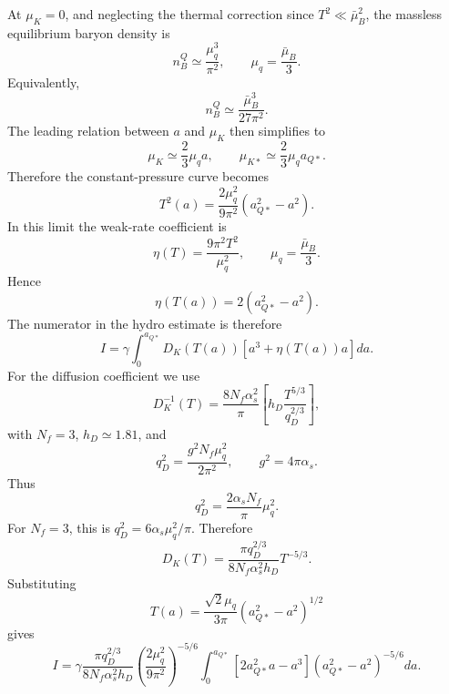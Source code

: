 At \(\mu_K=0\), and neglecting the thermal correction since
\(T^2\ll \bar\mu_B^2\), the massless equilibrium baryon density is
\begin{equation}
n_B^Q\simeq\frac{\mu_q^3}{\pi^2},
\qquad
\mu_q=\frac{\bar\mu_B}{3}.
\end{equation}
Equivalently,
\begin{equation}
n_B^Q\simeq\frac{\bar\mu_B^3}{27\pi^2}.
\end{equation}
The leading relation between \(a\) and \(\mu_K\) then simplifies to
\begin{equation}
\mu_K\simeq \frac{2}{3}\mu_q a,
\qquad
\mu_{K*}\simeq \frac{2}{3}\mu_qa_{Q*}.
\end{equation}
Therefore the constant-pressure curve becomes
\begin{equation}
T^2(a)
=
\frac{2\mu_q^2}{9\pi^2}
\left(a_{Q*}^2-a^2\right).
\end{equation}
In this limit the weak-rate coefficient is
\begin{equation}
\eta(T)=\frac{9\pi^2T^2}{\mu_q^2},
\qquad
\mu_q=\frac{\bar\mu_B}{3}.
\end{equation}
Hence
\begin{equation}
\eta(T(a))
=
2\left(a_{Q*}^2-a^2\right).
\end{equation}
The numerator in the hydro estimate is therefore
\begin{equation}
I
=
\gamma
\int_0^{a_{Q*}}
D_K(T(a))
\left[a^3+\eta(T(a))a\right]da .
\end{equation}
For the diffusion coefficient we use
\begin{equation}
D_K^{-1}(T)
=
\frac{8N_f\alpha_s^2}{\pi}
\left[
h_D\frac{T^{5/3}}{q_D^{2/3}}
\right],
\end{equation}
with \(N_f=3\), \(h_D\simeq1.81\), and
\begin{equation}
q_D^2=\frac{g^2N_f\mu_q^2}{2\pi^2},
\qquad
g^2=4\pi\alpha_s.
\end{equation}
Thus
\begin{equation}
q_D^2=\frac{2\alpha_sN_f}{\pi}\mu_q^2 .
\end{equation}
For \(N_f=3\), this is \(q_D^2=6\alpha_s\mu_q^2/\pi\).
Therefore
\begin{equation}
D_K(T)
=
\frac{\pi q_D^{2/3}}{8N_f\alpha_s^2h_D}
T^{-5/3}.
\end{equation}
Substituting
\begin{equation}
T(a)=
\frac{\sqrt{2}\mu_q}{3\pi}
\left(a_{Q*}^2-a^2\right)^{1/2}
\end{equation}
gives
\begin{equation}
I
=
\gamma
\frac{\pi q_D^{2/3}}{8N_f\alpha_s^2h_D}
\left(\frac{2\mu_q^2}{9\pi^2}\right)^{-5/6}
\int_0^{a_{Q*}}
\left[
2a_{Q*}^2a-a^3
\right]
\left(a_{Q*}^2-a^2\right)^{-5/6}da .
\end{equation}
